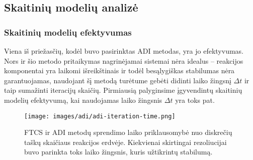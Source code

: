 \subsection{Skaitinių modelių analizė}


\subsubsection*{Skaitinių modelių efektyvumas}

Viena iš priežasčių, kodėl buvo pasirinktas ADI metodas, yra jo efektyvumas. Nors ir šio metodo pritaikymas nagrinėjamai sistemai nėra idealus -- reakcijos komponentai yra laikomi išreikštinais ir todėl besąlygiškas stabilumas nėra garantuojamas, naudojant šį metodą turėtume gebėti didinti laiko žingsnį $\Delta t$ ir taip sumažinti iteracijų skaičių. Pirmiausią palyginsime įgyvendintų skaitinių modelių efektyvumą, kai naudojamas laiko žingsnis $\Delta t$ yra toks pat.

\begin{figure}[h!]
  \centering
  \texttt{[image: images/adi/adi-iteration-time.png]}
  \caption{FTCS ir ADI metodų sprendimo laiko priklausomybė nuo diskrečių taškų skaičiaus reakcijos erdvėje. Kiekvienai skirtingai rezoliucijai buvo parinkta toks laiko žingsnis, kuris užtikrintų stabilumą.}
  \label{fig:adi-iteration-time}
\end{figure}